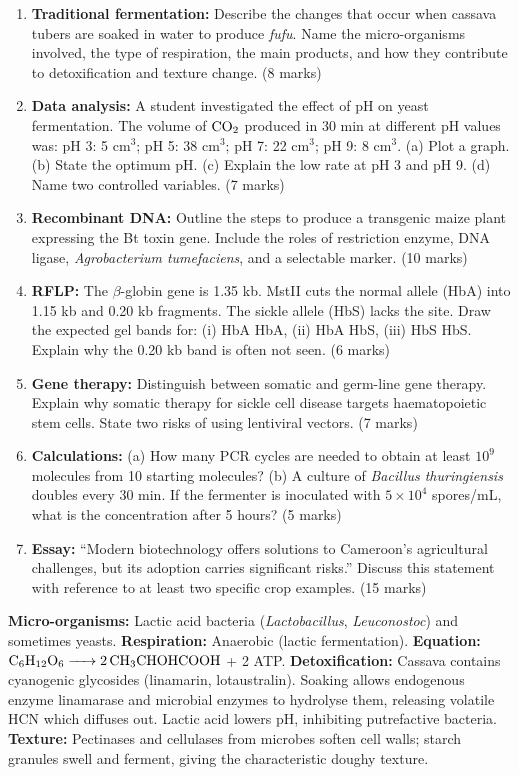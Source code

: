 \documentclass[11pt]{article}
\begin{document}
\begin{exercice}
\begin{enumerate}
\item \textbf{Traditional fermentation:} Describe the changes that occur when cassava tubers are soaked in water to produce \emph{fufu}. Name the micro-organisms involved, the type of respiration, the main products, and how they contribute to detoxification and texture change. (8 marks)
\item \textbf{Data analysis:} A student investigated the effect of pH on yeast fermentation. The volume of $\ce{CO2}$ produced in 30 min at different pH values was: pH 3: 5 cm$^3$; pH 5: 38 cm$^3$; pH 7: 22 cm$^3$; pH 9: 8 cm$^3$. (a) Plot a graph. (b) State the optimum pH. (c) Explain the low rate at pH 3 and pH 9. (d) Name two controlled variables. (7 marks)
\item \textbf{Recombinant DNA:} Outline the steps to produce a transgenic maize plant expressing the Bt toxin gene. Include the roles of restriction enzyme, DNA ligase, \emph{Agrobacterium tumefaciens}, and a selectable marker. (10 marks)
\item \textbf{RFLP:} The $\beta$-globin gene is 1.35 kb. MstII cuts the normal allele (HbA) into 1.15 kb and 0.20 kb fragments. The sickle allele (HbS) lacks the site. Draw the expected gel bands for: (i) HbA HbA, (ii) HbA HbS, (iii) HbS HbS. Explain why the 0.20 kb band is often not seen. (6 marks)
\item \textbf{Gene therapy:} Distinguish between somatic and germ-line gene therapy. Explain why somatic therapy for sickle cell disease targets haematopoietic stem cells. State two risks of using lentiviral vectors. (7 marks)
\item \textbf{Calculations:} (a) How many PCR cycles are needed to obtain at least $10^9$ molecules from 10 starting molecules? (b) A culture of \emph{Bacillus thuringiensis} doubles every 30 min. If the fermenter is inoculated with $5 \times 10^4$ spores/mL, what is the concentration after 5 hours? (5 marks)
\item \textbf{Essay:} ``Modern biotechnology offers solutions to Cameroon's agricultural challenges, but its adoption carries significant risks.'' Discuss this statement with reference to at least two specific crop examples. (15 marks)
\end{enumerate}
\end{exercice}

\begin{corrige}
\textbf{Micro-organisms:} Lactic acid bacteria (\emph{Lactobacillus}, \emph{Leuconostoc}) and sometimes yeasts. \textbf{Respiration:} Anaerobic (lactic fermentation). \textbf{Equation:} $\ce{C6H12O6 -> 2 CH3CHOHCOOH}$ + 2 ATP. \textbf{Detoxification:} Cassava contains cyanogenic glycosides (linamarin, lotaustralin). Soaking allows endogenous enzyme linamarase and microbial enzymes to hydrolyse them, releasing volatile HCN which diffuses out. Lactic acid lowers pH, inhibiting putrefactive bacteria. \textbf{Texture:} Pectinases and cellulases from microbes soften cell walls; starch granules swell and ferment, giving the characteristic doughy texture.
\end{corrige}
\end{document}
